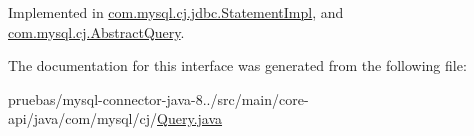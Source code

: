 Implemented in \mbox{\hyperlink{classcom_1_1mysql_1_1cj_1_1jdbc_1_1_statement_impl_a45e2d251ef9edf83345cde29d58dd704}{com.\+mysql.\+cj.\+jdbc.\+Statement\+Impl}}, and \mbox{\hyperlink{classcom_1_1mysql_1_1cj_1_1_abstract_query_a3cd18b8d44105a54f7b044cf31c04c45}{com.\+mysql.\+cj.\+Abstract\+Query}}.



The documentation for this interface was generated from the following file\+:\begin{DoxyCompactItemize}
\item 
pruebas/mysql-\/connector-\/java-\/8../src/main/core-\/api/java/com/mysql/cj/\mbox{\hyperlink{_query_8java}{Query.\+java}}\end{DoxyCompactItemize}

